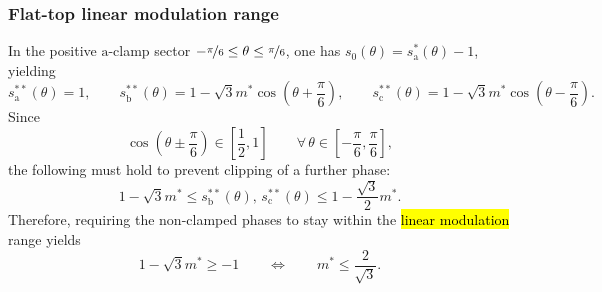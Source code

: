 \begin{frame}
    \frametitle{Flat-top linear modulation range}
    In the positive \(\mathrm{a}\)-clamp sector $-\nicefrac{\pi}{6}\leq \theta \leq \nicefrac{\pi}{6}$,  one has \(s_0(\theta)=s_\mathrm{a}^*(\theta)-1\), yielding
    \begin{equation}
        s_\mathrm{a}^{**}(\theta)=1,
        \qquad
        s_\mathrm{b}^{**}(\theta)=1-\sqrt{3}m^*\cos\!\left(\theta+\frac{\pi}{6}\right),
        \qquad
        s_\mathrm{c}^{**}(\theta)=1-\sqrt{3}m^*\cos\!\left(\theta-\frac{\pi}{6}\right).
        \label{eq:flat_top_positive_a_sector}
    \end{equation}\pause
    Since
    \begin{equation}
        \cos\!\left(\theta\pm\frac{\pi}{6}\right)\in\left[\frac{1}{2},1\right]
        \qquad \forall\, \theta\in\left[-\frac{\pi}{6},\frac{\pi}{6}\right],
    \end{equation}\pause
    the following must hold to prevent clipping of a further phase:
    \begin{equation}
        1-\sqrt{3}m^*
        \leq
        s_\mathrm{b}^{**}(\theta),\, s_\mathrm{c}^{**}(\theta)
        \leq
        1-\frac{\sqrt{3}}{2}m^*.
    \end{equation}\pause
    Therefore, requiring the non-clamped phases to stay within the \hl{linear modulation} range yields
    \begin{equation}
        1-\sqrt{3}m^* \geq -1
        \qquad \Leftrightarrow \qquad
        m^*\leq \frac{2}{\sqrt{3}}.
    \end{equation}
\end{frame}

